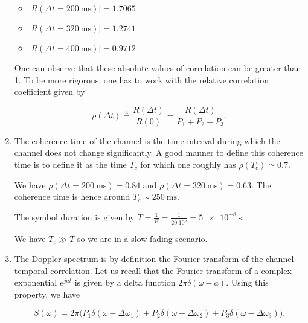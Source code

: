\documentclass [a4paper, 11pt] {article}
\begin{document}
\begin{solution}
\begin{enumerate}
\begin{minipage}{0.45\textwidth}
\begin{itemize}
            \end{itemize}
            \end{minipage}
            \hfill
            \begin{minipage}{0.45\textwidth}
                \begin{itemize}
                \item[] $|R(\Delta t = \SI{200}{\milli\second})| = 1.7065$
                \item[] $|R(\Delta t = \SI{320}{\milli\second})| = 1.2741$
                \item[] $|R(\Delta t = \SI{400}{\milli\second})| = 0.9712$
            \end{itemize}
            \end{minipage}

        \medskip

        One can observe that these absolute values of correlation can be greater than 1. To be more rigorous, one has to work with the relative correlation coefficient given by

        \begin{equation}
             \rho(\Delta t) \triangleq \dfrac{R(\Delta t)}{R(0)} = \dfrac{R(\Delta t)}{P_1 + P_2 + P_3}.
        \end{equation}
        \item The coherence time of the channel is the time interval during which the channel does not change significantly. A good manner to define this coherence time is to define it as the time $T_c$ for which one roughly has $\rho(T_c) \simeq 0.7$.

        We have $\rho(\Delta t = \SI{200}{\milli\second}) = 0.84$ and $\rho(\Delta t = \SI{320}{\milli\second}) = 0.63$. The coherence time is hence around $T_c \sim \SI{250}{\milli\second}$.

        The symbol duration is given by $T=\frac{1}{B} = \frac{1}{20 \; 10^6} = \SI{5e-8}{\second}$.

        We have $T_c \gg T$ so we are in a slow fading scenario.


        \item The Doppler spectrum is by definition the Fourier transform of the channel temporal correlation. Let us recall that the Fourier transform of a complex exponential $e^{jat}$ is given by a delta function $2\pi \delta(\omega - a)$. Using this property, we have

        \begin{equation}
            S(\omega) =2\pi \bigg(P_1 \delta(\omega - \Delta \omega_1) + P_2 \delta(\omega - \Delta \omega_2) + P_3 \delta(\omega - \Delta \omega_3) \bigg).
        \end{equation}


\end{enumerate}
\end{solution}
\end{document}
